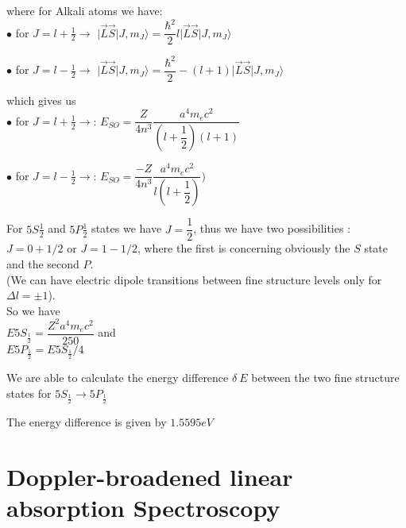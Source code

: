 \documentclass[openany,11pt,a4paper]{book}
\begin{document}
where for Alkali atoms we have:\\

$\bullet$ for $J=l+\frac{1}{2} \rightarrow$  $\vert \vec{L} \vec{S} \vert J, m_{J} \rangle  =\dfrac{\hbar^{2}}{2}l \vert \vec{L} \vec{S} \vert J, m_{J} \rangle $

$\bullet$ for $J=l-\frac{1}{2} \rightarrow$  $\vert \vec{L} \vec{S} \vert J, m_{J} \rangle  =\dfrac{\hbar^{2}}{2} -(l+1) \vert \vec{L} \vec{S} \vert J, m_{J} \rangle $

which gives us \\


$\bullet$ for $J=l+\frac{1}{2} \rightarrow$: $E_{SO}= \dfrac{Z}{4 n^{3}} \dfrac{a^{4} m_{e}c^{2}}{(l+\dfrac{1}{2})(l+1)} $




$\bullet$ for $J=l-\frac{1}{2} \rightarrow$: $E_{SO}= \dfrac{-Z}{4 n^{3}} \dfrac{a^{4} m_{e}c^{2}}{l(l+\dfrac{1}{2})})$


For $5S\frac{1}{2}$ and $5P\frac{1}{2}$ states we have $J=\dfrac{1}{2}$,
thus we have two possibilities : $J= 0+ 1/2$ or $J=1- 1/2$, where the first is concerning obviously the $S$ state and the second $P$.\\
(We can have electric dipole transitions between fine structure levels only for $\Delta l= \pm 1$).\\

So we have \\



$E5S _{\frac{1}{2}} =  \dfrac{ Z^{2} a^{4} m_{e} c^{2}}{250}$ and \\

$E5P _{\frac{1}{2}} = E5S _{\frac{1}{2}}/4 $




We are able to calculate the energy difference $\delta\ E $ between the two fine structure states for $5S _{\frac{1}{2}} \rightarrow 5P _{\frac{1}{2}}  $ 



The energy difference  is given by $1.5595 eV$



\section{Doppler-broadened linear absorption Spectroscopy}
\end{document}
